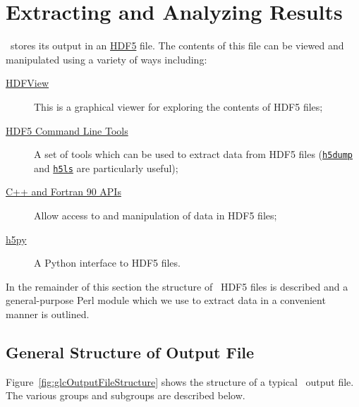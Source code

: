 \chapter{Extracting and Analyzing Results}

\glc\ stores its output in an \href{http://www.hdfgroup.org/HDF5/}{HDF5} file. The contents of this file can be viewed and manipulated using a variety of ways including:
\begin{description}
 \item[\href{http://www.hdfgroup.org/hdf-java-html/hdfview/}{{\sc HDFView}}] This is a graphical viewer for exploring the contents of HDF5 files;
 \item[\href{http://www.hdfgroup.org/products/hdf5_tools/index.html\#h5dist}{HDF5 Command Line Tools}] A set of tools which can be used to extract data from HDF5 files (\href{http://www.hdfgroup.org/HDF5/doc/RM/Tools.html#Tools-Dump}{{\tt h5dump}} and \href{http://www.hdfgroup.org/HDF5/doc/RM/Tools.html#Tools-Ls}{{\tt h5ls}} are particularly useful);
 \item[\href{http://www.hdfgroup.org/HDF5/doc/RM/RM_H5Front.html\#F90andCPPlus}{C++ and Fortran 90 APIs}] Allow access to and manipulation of data in HDF5 files;
 \item[\href{http://code.google.com/p/h5py/}{{\sc h5py}}] A Python interface to HDF5 files.
\end{description}

In the remainder of this section the structure of \glc\ HDF5 files is described and a general-purpose Perl module which we use to extract data in a convenient manner is outlined.

\section{General Structure of Output File}

Figure~\ref{fig:glcOutputFileStructure} shows the structure of a typical \glc\ output file. The various groups and subgroups are described below.

